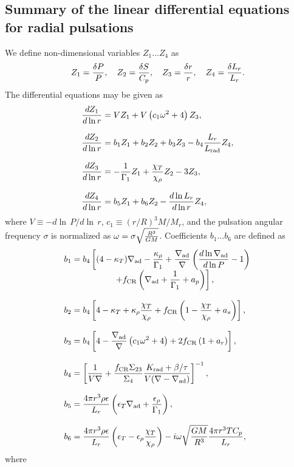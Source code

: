 \documentclass[fleqn,usenatbib]{mnras}
\begin{document}
\subsection{Summary of the linear differential equations for radial pulsations}
We define non-dimensional variables $Z_1 \ldots Z_4$ as
\begin{equation}
Z_1={\delta P\over P}, \quad Z_2={\delta S\over C_p}, \quad Z_3 = {\delta r\over r},
\quad Z_4 = {\delta L_r\over L_r}.
\end{equation}
The differential equations may be given as
\begin{equation}
\begin{array}{ll}\displaystyle
{dZ_1\over d\ln r} = VZ_1 + V\left(c_1\omega^2+4\right)Z_3,
\cr\cr \displaystyle
{dZ_2\over d\ln r} = b_1Z_1 + b_2Z_2 + b_3Z_3 -b_4{L_r\over L_{\rm rad}}Z_4,
\cr\cr \displaystyle
{dZ_3\over d\ln r}=  - {1\over\Gamma_1}Z_1 +{\chi_T\over\chi_\rho}Z_2 - 3Z_3,
\cr\cr \displaystyle
{dZ_4\over d\ln r}= b_5Z_1 + b_6Z_2 - {d\ln L_r\over d\ln r}Z_4,
\end{array}
\end{equation}
where $V\equiv -d\ln\,P/d\ln\,r$, $c_1\equiv(r/R)^3M/M_r$, 
and the pulsation angular frequency $\sigma$ is normalized as 
$\omega=\sigma\sqrt{R^3\over GM}$. 
Coefficients $b_1 \ldots b_6$ are defined as
\begin{equation*}
\begin{array}{ll}\displaystyle
b_1 = b_4\left[(4-\kappa_T)\nabla_{\rm ad}-{\kappa_\rho\over\Gamma_1}
+{\nabla_{\rm ad}\over \nabla}\left({d\ln\nabla_{\rm ad}\over d\ln P}-1\right)
\right. \cr \displaystyle \qquad \qquad \qquad \left. 
+f_{\rm CR}\left(\nabla_{\rm ad}+{1\over \Gamma_1}+a_p\right)\right],
\cr\cr \displaystyle
b_2 = b_4\left[ 4-\kappa_T +\kappa_\rho{\chi_T\over\chi_\rho}+ f_{\rm CR}\left(1-{\chi_T\over\chi_\rho} 
+a_s\right)\right],
\cr\cr \displaystyle
b_3 = b_4\left[4-{\nabla_{\rm ad}\over\nabla}\left(c_1\omega^2+4\right)+2f_{\rm CR}\left(1+a_r\right)\right],
\cr\cr \displaystyle
b_4 =\left[{1\over V\nabla}+{f_{\rm CR}\Sigma_{23}\over\Sigma_4}
{K_{\rm rad}+\beta/\tau
\over V(\nabla-\nabla_{\rm ad})}\right]^{-1},
\cr\cr \displaystyle
b_5 = {4\pi r^3\rho\epsilon\over L_r}\left(\epsilon_T\nabla_{\rm ad}+{\epsilon_\rho\over\Gamma_1}\right),
\cr\cr \displaystyle
b_6 = {4\pi r^3\rho\epsilon\over L_r}\left(\epsilon_T-\epsilon_\rho{\chi_T\over\chi_\rho}\right) - i\omega\sqrt{GM\over R^3}{4\pi r^3 TC_p\over L_r},
\end{array}
\end{equation*}
where 
\end{document}

